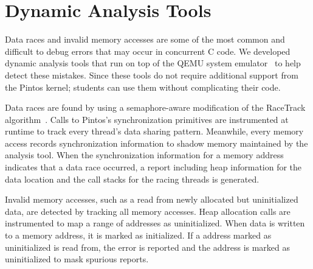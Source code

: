 \section{Dynamic Analysis Tools}

Data races and invalid memory accesses are some of the most common and
difficult to debug errors that may occur in concurrent C code.
We developed dynamic analysis tools that run on top of the QEMU
system emulator~\cite{Bellard2005QEMU} to help detect these mistakes. 
Since these tools do not require additional support from the Pintos kernel; 
students can use them without complicating their code.

Data races are found by using a semaphore-aware modification of the RaceTrack algorithm~\cite{RaceTrack}. 
Calls to Pintos's synchronization primitives are instrumented at runtime to track every thread's data
sharing pattern.  Meanwhile, every memory access records synchronization information to shadow memory
maintained by the analysis tool. When the synchronization information for a memory address
indicates that a data race occurred, a report including heap information for the data location and the
call stacks for the racing threads is generated.

Invalid memory accesses, such as a read from newly allocated but uninitialized data, are detected by
tracking all memory accesses.  Heap allocation calls are instrumented to map a range of addresses as
uninitialized. When data is written to a memory address, it is marked as initialized. If a address
marked as uninitialized is read from, the error is reported and the address is marked as
uninitialized to mask spurious reports. 


